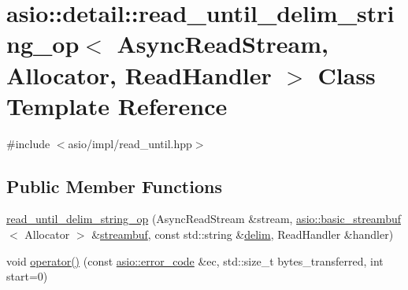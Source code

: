 \hypertarget{classasio_1_1detail_1_1read__until__delim__string__op}{}\section{asio\+:\+:detail\+:\+:read\+\_\+until\+\_\+delim\+\_\+string\+\_\+op$<$ Async\+Read\+Stream, Allocator, Read\+Handler $>$ Class Template Reference}
\label{classasio_1_1detail_1_1read__until__delim__string__op}


{\ttfamily \#include $<$asio/impl/read\+\_\+until.\+hpp$>$}

\subsection*{Public Member Functions}
\begin{DoxyCompactItemize}
\item 
\hyperlink{classasio_1_1detail_1_1read__until__delim__string__op_aa2df29e1d309ef89d7df5d1f2558eb71}{read\+\_\+until\+\_\+delim\+\_\+string\+\_\+op} (Async\+Read\+Stream \&stream, \hyperlink{classasio_1_1basic__streambuf}{asio\+::basic\+\_\+streambuf}$<$ Allocator $>$ \&\hyperlink{namespaceasio_a6a7ba348943527312eeace3492bf32ee}{streambuf}, const std\+::string \&\hyperlink{group__async__read__until_gafbf62a75ad736aff941c1f70d4b3c223}{delim}, Read\+Handler \&handler)
\item 
void \hyperlink{classasio_1_1detail_1_1read__until__delim__string__op_aa8a7c10f635f8b200326724cff9cc230}{operator()} (const \hyperlink{classasio_1_1error__code}{asio\+::error\+\_\+code} \&ec, std\+::size\+\_\+t bytes\+\_\+transferred, int start=0)
\end{DoxyCompactItemize}
